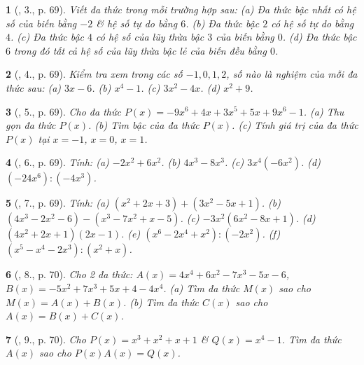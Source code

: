 \documentclass{article}
\newtheorem{baitoan}{}
\begin{document}
\begin{baitoan}[\cite{SGK_Toan_7_Canh_Dieu_tap_2}, 3., p. 69]
	Viết đa thức trong mỗi trường hợp sau: (a) Đa thức bậc nhất có hệ số của biến bằng $-2$ \& hệ số tự do bằng $6$. (b) Đa thức bậc $2$ có hệ số tự do bằng $4$. (c) Đa thức bậc $4$ có hệ số của lũy thừa bậc $3$ của biến bằng $0$. (d) Đa thức bậc $6$  trong đó tất cả hệ số của lũy thừa bậc lẻ của biến đều bằng $0$. 
\end{baitoan}

\begin{baitoan}[\cite{SGK_Toan_7_Canh_Dieu_tap_2}, 4., p. 69]
	Kiểm tra xem trong các số $-1,0,1,2$, số nào là nghiệm của mỗi đa thức sau: (a) $3x - 6$. (b) $x^4 - 1$. (c) $3x^2 - 4x$. (d) $x^2 + 9$.
\end{baitoan}

\begin{baitoan}[\cite{SGK_Toan_7_Canh_Dieu_tap_2}, 5., p. 69]
	Cho đa thức $P(x) = -9x^6 + 4x + 3x^5 + 5x + 9x^6 - 1$. (a) Thu gọn đa thức $P(x)$. (b) Tìm bậc của đa thức $P(x)$. (c) Tính giá trị của đa thức $P(x)$ tại $x = -1$, $x = 0$, $x = 1$.
\end{baitoan}

\begin{baitoan}[\cite{SGK_Toan_7_Canh_Dieu_tap_2}, 6., p. 69]
	Tính: (a) $-2x^2 + 6x^2$. (b) $4x^3 - 8x^3$. (c) $3x^4(-6x^2)$. (d) $(-24x^6):(-4x^3)$.
\end{baitoan}

\begin{baitoan}[\cite{SGK_Toan_7_Canh_Dieu_tap_2}, 7., p. 69]
	Tính: (a) $(x^2 + 2x + 3) + (3x^2 - 5x + 1)$. (b) $(4x^3 - 2x^2 - 6) - (x^3 - 7x^2 + x - 5)$. (c) $-3x^2(6x^2 - 8x + 1)$. (d) $(4x^2 + 2x + 1)(2x - 1)$. (e) $(x^6 - 2x^4 + x^2):(-2x^2)$. (f) $(x^5 - x^4 - 2x^3):(x^2 + x)$.
\end{baitoan}

\begin{baitoan}[\cite{SGK_Toan_7_Canh_Dieu_tap_2}, 8., p. 70]
	Cho 2 đa thức: $A(x) = 4x^4 + 6x^2 - 7x^3 - 5x - 6$, $B(x) = -5x^2 + 7x^3 + 5x + 4 - 4x^4$. (a) Tìm đa thức $M(x)$ sao cho $M(x) = A(x) + B(x)$. (b) Tìm đa thức $C(x)$ sao cho $A(x) = B(x) + C(x)$.
\end{baitoan}

\begin{baitoan}[\cite{SGK_Toan_7_Canh_Dieu_tap_2}, 9., p. 70]
	Cho $P(x) = x^3 + x^2 + x +1$ \& $Q(x) = x^4 - 1$. Tìm đa thức $A(x)$ sao cho $P(x)A(x) = Q(x)$. 
\end{baitoan}
\end{document}
